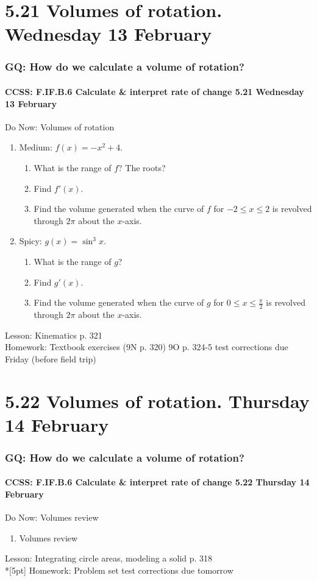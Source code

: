 \documentclass{beamer}
\begin{document}
\section{5.21 Volumes of rotation. Wednesday 13 February}
  \frame
  {
    \frametitle{GQ: How do we calculate a volume of rotation?}
    \framesubtitle{CCSS: F.IF.B.6 Calculate \& interpret rate of change \hfill \alert{5.21 Wednesday 13 February}}

    \begin{block}{Do Now: Volumes of rotation}
    \begin{enumerate}
        \item Medium: $f(x)=-x^2+4$.
        \begin{enumerate}
            \item What is the range of $f$? The roots?
            \item Find $f'(x)$.
            \item Find the volume generated when the curve of $f$ for $-2 \leq x \leq 2$ is revolved through $2\pi$ about the $x$-axis.
        \end{enumerate}
        \item Spicy: $g(x)= \sin^3x$.
        \begin{enumerate}
            \item What is the range of $g$?
            \item Find $g'(x)$.
            \item Find the volume generated when the curve of $g$ for $0 \leq x \leq \frac{\pi}{2}$ is revolved through $2\pi$ about the $x$-axis.
        \end{enumerate}
    \end{enumerate}
    \end{block}
    Lesson: Kinematics p. 321\\
    Homework: Textbook exercises (9N p. 320) 9O p. 324-5 \alert{test corrections due Friday (before field trip)}
  }

\section{5.22 Volumes of rotation. Thursday 14 February}
  \frame
  {
    \frametitle{GQ: How do we calculate a volume of rotation?}
    \framesubtitle{CCSS: F.IF.B.6 Calculate \& interpret rate of change \hfill \alert{5.22 Thursday 14 February}}

    \begin{block}{Do Now: Volumes review}
    \begin{enumerate}
        \item Volumes review
    \end{enumerate}
    \end{block}
    Lesson: Integrating circle areas, modeling a solid p. 318\\*[5pt]
    Homework: Problem set \alert{test corrections due tomorrow}
  }
\end{document}
